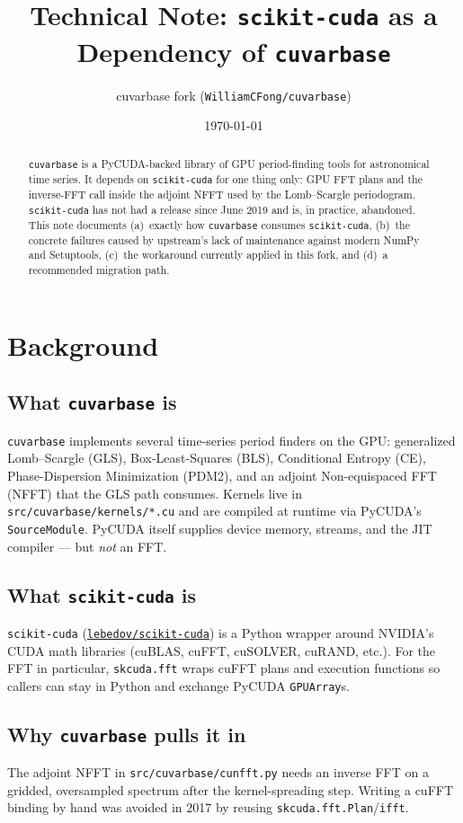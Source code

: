 \documentclass[11pt,a4paper]{article}
\title{Technical Note: \texttt{scikit-cuda} as a Dependency of \texttt{cuvarbase}}
\author{cuvarbase fork (\texttt{WilliamCFong/cuvarbase})}
\date{\today}
\begin{document}
\maketitle

\begin{abstract}
\noindent
\texttt{cuvarbase} is a PyCUDA-backed library of GPU period-finding tools for
astronomical time series. It depends on \texttt{scikit-cuda} for one thing
only: GPU FFT plans and the inverse-FFT call inside the adjoint NFFT used by
the Lomb--Scargle periodogram. \texttt{scikit-cuda} has not had a release since
June 2019 and is, in practice, abandoned. This note documents (a)~exactly how
\texttt{cuvarbase} consumes \texttt{scikit-cuda}, (b)~the concrete failures
caused by upstream's lack of maintenance against modern NumPy and Setuptools,
(c)~the workaround currently applied in this fork, and (d)~a recommended
migration path.
\end{abstract}

\section{Background}

\subsection{What \texttt{cuvarbase} is}
\texttt{cuvarbase} implements several time-series period finders on the GPU:
generalized Lomb--Scargle (GLS), Box-Least-Squares (BLS), Conditional Entropy
(CE), Phase-Dispersion Minimization (PDM2), and an adjoint Non-equispaced FFT
(NFFT) that the GLS path consumes. Kernels live in
\texttt{src/cuvarbase/kernels/*.cu} and are compiled at runtime via PyCUDA's
\texttt{SourceModule}. PyCUDA itself supplies device memory, streams, and the
JIT compiler --- but \emph{not} an FFT.

\subsection{What \texttt{scikit-cuda} is}
\texttt{scikit-cuda} (\href{https://github.com/lebedov/scikit-cuda}{\texttt{lebedov/scikit-cuda}})
is a Python wrapper around NVIDIA's CUDA math libraries (cuBLAS, cuFFT,
cuSOLVER, cuRAND, etc.). For the FFT in particular, \texttt{skcuda.fft} wraps
cuFFT plans and execution functions so callers can stay in Python and exchange
PyCUDA \texttt{GPUArray}s.

\subsection{Why \texttt{cuvarbase} pulls it in}
The adjoint NFFT in \texttt{src/cuvarbase/cunfft.py} needs an inverse FFT on a
gridded, oversampled spectrum after the kernel-spreading step. Writing a cuFFT
binding by hand was avoided in 2017 by reusing
\texttt{skcuda.fft.Plan}/\texttt{ifft}.
\end{document}
